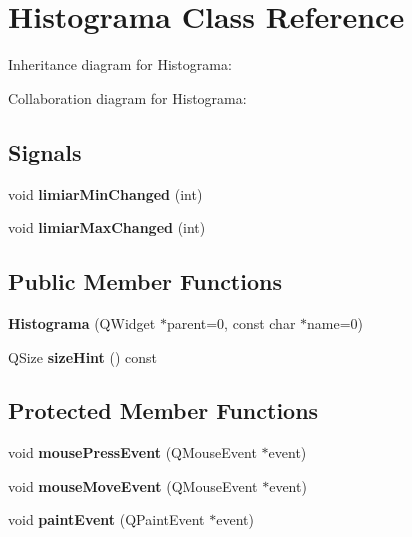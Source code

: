 \hypertarget{classHistograma}{}\section{Histograma Class Reference}
\label{classHistograma}


Inheritance diagram for Histograma\+:


Collaboration diagram for Histograma\+:
\subsection*{Signals}
\begin{DoxyCompactItemize}
\item 
void {\bfseries limiar\+Min\+Changed} (int)\hypertarget{classHistograma_a7420838f7995391246d553b34b12ff60}{}\label{classHistograma_a7420838f7995391246d553b34b12ff60}

\item 
void {\bfseries limiar\+Max\+Changed} (int)\hypertarget{classHistograma_a734eb3ddc2c33230ce1d77b61ae3c5d2}{}\label{classHistograma_a734eb3ddc2c33230ce1d77b61ae3c5d2}

\end{DoxyCompactItemize}
\subsection*{Public Member Functions}
\begin{DoxyCompactItemize}
\item 
{\bfseries Histograma} (Q\+Widget $\ast$parent=0, const char $\ast$name=0)\hypertarget{classHistograma_a91298781c7f73979c9498ce9a7019b1a}{}\label{classHistograma_a91298781c7f73979c9498ce9a7019b1a}

\item 
Q\+Size {\bfseries size\+Hint} () const \hypertarget{classHistograma_ab0b17597db850f85184580462e7f770e}{}\label{classHistograma_ab0b17597db850f85184580462e7f770e}

\end{DoxyCompactItemize}
\subsection*{Protected Member Functions}
\begin{DoxyCompactItemize}
\item 
void {\bfseries mouse\+Press\+Event} (Q\+Mouse\+Event $\ast$event)\hypertarget{classHistograma_a19d607df1946a802aecb7e6b596444c2}{}\label{classHistograma_a19d607df1946a802aecb7e6b596444c2}

\item 
void {\bfseries mouse\+Move\+Event} (Q\+Mouse\+Event $\ast$event)\hypertarget{classHistograma_a17da404092f647be3bbe68f322ab971b}{}\label{classHistograma_a17da404092f647be3bbe68f322ab971b}

\item 
void {\bfseries paint\+Event} (Q\+Paint\+Event $\ast$event)\hypertarget{classHistograma_a8f823aef73bfaac5615f8bc250aeb032}{}\label{classHistograma_a8f823aef73bfaac5615f8bc250aeb032}

\end{DoxyCompactItemize}



